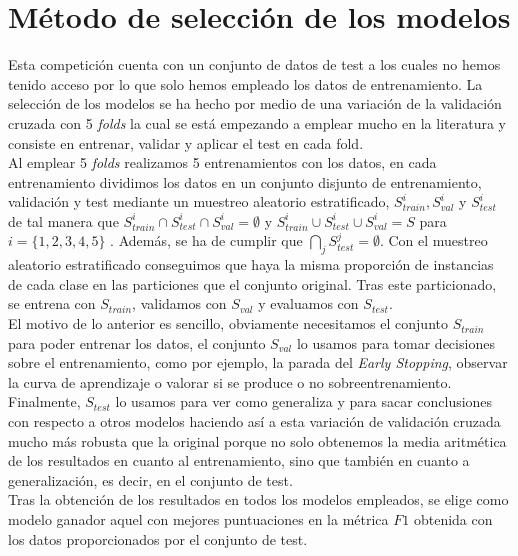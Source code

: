 
\section{Método de selección de los modelos}

    

    Esta competición cuenta con un conjunto de datos de test a los cuales no hemos tenido acceso por lo que solo hemos empleado los datos de entrenamiento. La selección de los modelos se ha hecho por medio de una variación de la validación cruzada con 5 \textit{folds} la cual se está empezando a emplear mucho en la literatura y consiste en entrenar, validar y aplicar el test en cada fold. \\
    
    Al emplear 5 \textit{folds} realizamos 5 entrenamientos con los datos, en cada entrenamiento dividimos los datos en un conjunto disjunto de entrenamiento, validación y test mediante un muestreo aleatorio estratificado, $S_{train}^i, S_{val}^i$ y $S_{test}^i$ de tal manera que ${S_{train}^i \cap S_{test}^i \cap S_{val}^i = \emptyset}$ y ${S_{train}^i \cup S_{test}^i \cup S_{val}^i = S}$ para $i=\{1,2,3,4,5\}$ . Además, se ha de cumplir que $\bigcap_j S_{test}^j = \emptyset$. Con el muestreo aleatorio estratificado conseguimos que haya la misma proporción de instancias de cada clase en las particiones que el conjunto original. Tras este particionado, se entrena con $S_{train}$, validamos con $S_{val}$ y evaluamos con $S_{test}$.  \\
    
    El motivo de lo anterior es sencillo, obviamente necesitamos el conjunto $S_{train}$ para poder entrenar los datos, el conjunto $S_{val}$ lo usamos para tomar decisiones sobre el entrenamiento, como por ejemplo, la parada del \textit{Early Stopping}, observar la curva de aprendizaje o valorar si se produce o no sobreentrenamiento. Finalmente, $S_{test}$ lo usamos para ver como generaliza y para sacar conclusiones con respecto a otros modelos haciendo así a esta variación de validación cruzada mucho más robusta que la original porque no solo obtenemos la media aritmética de los resultados en cuanto al entrenamiento, sino que también en cuanto a generalización, es decir, en el conjunto de test. \\
    
    Tras la obtención de los resultados en todos los modelos empleados, se elige como modelo ganador aquel con mejores puntuaciones en la métrica $F1$ obtenida con los datos proporcionados por el conjunto de test. \\



\endinput